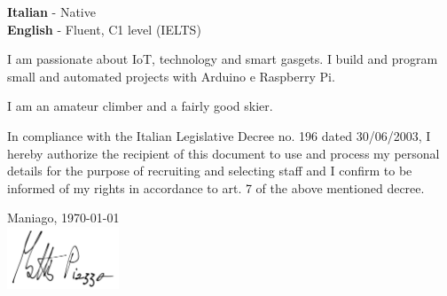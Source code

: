 \documentclass[9pt]{developercv} %
\begin{document}
%
%
\begin{minipage}[t]{0.3\textwidth}
	\vspace{-\baselineskip} %
%
	\textbf{Italian} - Native\\
	\textbf{English}  - Fluent, C1 level (IELTS)
%
\end{minipage}
\hfill
\begin{minipage}[t]{0.3\textwidth}
	\vspace{-\baselineskip} %
	I am passionate about IoT, technology and smart gasgets. 
	I build and program small and automated projects with Arduino e Raspberry Pi.
%
\end{minipage}
\hfill
\begin{minipage}[t]{0.3\textwidth}
	\vspace{-\baselineskip} %
%
	I am an amateur climber and a fairly good skier. %
%
\end{minipage}

\pagebreak 



In compliance with the Italian Legislative Decree no. 196 dated 30/06/2003, I hereby authorize the recipient of this document to use and process my personal details for the purpose of recruiting and selecting staff and I confirm to be informed of my rights in accordance to art. 7 of the above mentioned decree.

\vspace{0.5cm}
Maniago, \today \\

\vspace{0.2cm}
\includegraphics[width=0.25\textwidth]{firma.jpg}
\end{document}
